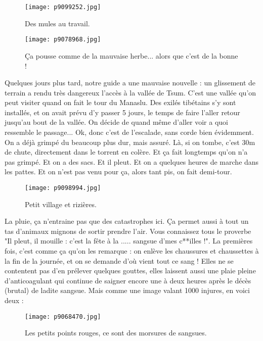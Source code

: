 \documentclass{book}
\begin{document}
\begin{figure}[h]
\centering
\texttt{[image: p9099252.jpg]}
\caption*{Des mules au travail.}
\end{figure}


\begin{figure}[h]
\centering
\texttt{[image: p9078968.jpg]}
\caption*{Ça pousse comme de la mauvaise herbe... alors que c'est de la bonne !}
\end{figure}

Quelques jours plus tard, notre guide a une mauvaise nouvelle : un glissement de terrain a rendu très dangereux l'accès à la vallée de Tsum. C'est une vallée qu'on peut visiter quand on fait le tour du Manaslu. Des exilés tibétains s'y sont installés, et on avait prévu d'y passer 5 jours, le temps de faire l'aller retour jusqu'au bout de la vallée. On décide de quand même d'aller voir a quoi ressemble le passage... Ok, donc c'est de l'escalade, sans corde bien évidemment. On a déjà grimpé du beaucoup plus dur, mais assuré. Là, si on tombe, c'est 30m de chute, directement dans le torrent en colère. Et ça fait longtemps qu'on n'a pas grimpé. Et on a des sacs. Et il pleut. Et on a quelques heures de marche dans les pattes. Et on n'est pas venu pour ça, alors tant pis, on fait demi-tour.


\begin{figure}[h]
\centering
\texttt{[image: p9098994.jpg]}
\caption*{Petit village et rizières.}
\end{figure}

La pluie, ça n'entraine pas que des catastrophes ici. Ça permet aussi à tout un tas d'animaux mignons de sortir prendre l'air. Vous connaissez tous le proverbe "Il pleut, il mouille : c'est la fête à la .....  sangsue d'mes c**illes !". La premières fois, c'est comme ça qu'on les remarque : on enlève les chaussures et chaussettes à la fin de la journée, et on se demande d'où vient tout ce sang ! Elles ne se contentent pas d'en prélever quelques gouttes, elles laissent aussi une plaie pleine d'anticoagulant qui continue de saigner encore une à deux heures après le décès (brutal) de ladite sangsue. Mais comme une image valant 1000 injures, en voici deux :


\begin{figure}[h]
\centering
\texttt{[image: p9068470.jpg]}
\caption*{Les petits points rouges, ce sont des morsures de sangsues.}
\end{figure}
\end{document}
